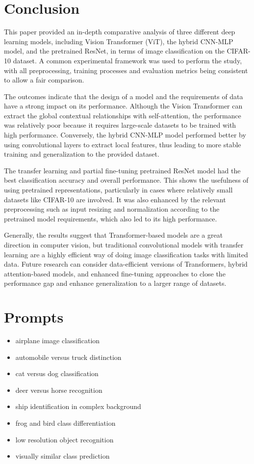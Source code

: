 \documentclass[conference]{IEEEtran}
\begin{document}
\section{Conclusion}

This paper provided an in-depth comparative analysis of three different deep learning models, including Vision Transformer (ViT), the hybrid CNN-MLP model, and the pretrained ResNet, in terms of image classification on the CIFAR-10 dataset. A common experimental framework was used to perform the study, with all preprocessing, training processes and evaluation metrics being consistent to allow a fair comparison.

The outcomes indicate that the design of a model and the requirements of data have a strong impact on its performance. Although the Vision Transformer can extract the global contextual relationships with self-attention, the performance was relatively poor because it requires large-scale datasets to be trained with high performance. Conversely, the hybrid CNN-MLP model performed better by using convolutional layers to extract local features, thus leading to more stable training and generalization to the provided dataset.

The transfer learning and partial fine-tuning pretrained ResNet model had the best classification accuracy and overall performance. This shows the usefulness of using pretrained representations, particularly in cases where relatively small datasets like CIFAR-10 are involved. It was also enhanced by the relevant preprocessing such as input resizing and normalization according to the pretrained model requirements, which also led to its high performance.

Generally, the results suggest that Transformer-based models are a great direction in computer vision, but traditional convolutional models with transfer learning are a highly efficient way of doing image classification tasks with limited data. Future research can consider data-efficient versions of Transformers, hybrid attention-based models, and enhanced fine-tuning approaches to close the performance gap and enhance generalization to a larger range of datasets.
\section{Prompts}

\begin{itemize}
\item airplane image classification
\item automobile versus truck distinction
\item cat versus dog classification
\item deer versus horse recognition
\item ship identification in complex background
\item frog and bird class differentiation
\item low resolution object recognition
\item visually similar class prediction
\end{itemize}



\end{document}
